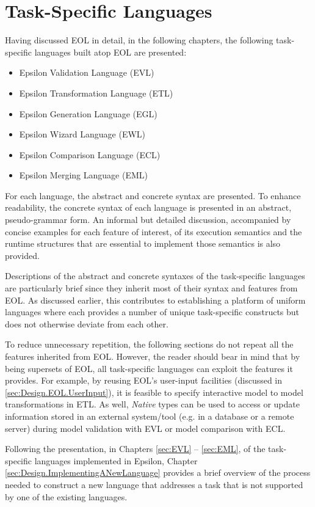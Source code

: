 \section{Task-Specific Languages}
\label{sec:TaskSpecificLanguages}

Having discussed EOL in detail, in the following chapters, the following task-specific languages built atop EOL are presented:

\begin{itemize}
	\item Epsilon Validation Language (EVL)
	\item Epsilon Transformation Language (ETL)
	\item Epsilon Generation Language (EGL)
	\item Epsilon Wizard Language (EWL)
	\item Epsilon Comparison Language (ECL)
	\item Epsilon Merging Language (EML)
\end{itemize}

For each language, the abstract and concrete syntax are presented. To enhance readability, the concrete syntax of each language is presented in an abstract, pseudo-grammar form. An informal but detailed discussion, accompanied by concise examples for each feature of interest, of its execution semantics and the runtime structures that are essential to implement those semantics is also provided.

Descriptions of the abstract and concrete syntaxes of the task-specific languages are particularly brief since they inherit most of their syntax and features from EOL. As discussed earlier, this contributes to establishing a platform of uniform languages where each provides a number of unique task-specific constructs but does not otherwise deviate from each other.

To reduce unnecessary repetition, the following sections do not repeat all the features inherited from EOL. However, the reader should bear in mind that by being supersets of EOL, all task-specific languages can exploit the features it provides. For example, by reusing EOL's user-input facilities (discussed in \ref{sec:Design.EOL.UserInput}), it is feasible to specify interactive model to model transformations in ETL. As well, \emph{Native} types can be used to access or update information stored in an external system/tool (e.g. in a database or a remote server) during model validation with EVL or model comparison with ECL.

Following the presentation, in Chapters \ref{sec:EVL} -- \ref{sec:EML}, of the task-specific languages implemented in Epsilon, Chapter \ref{sec:Design.ImplementingANewLanguage} provides a brief overview of the process needed to construct a new language that addresses a task that is not supported by one of the existing languages.















